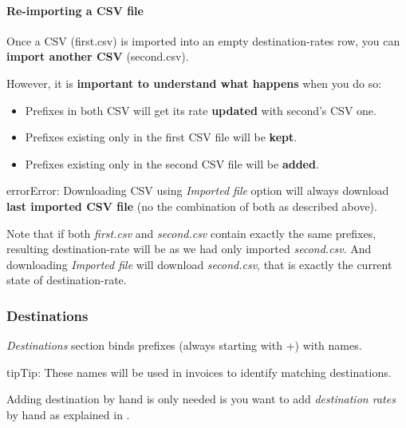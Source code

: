 \documentclass[letterpaper,10pt,english]{sphinxmanual}
\begin{document}
\paragraph{Re-importing a CSV file}
\label{administration_portal/brand/billing/destination_rates:re-importing-a-csv-file}
Once a CSV (first.csv) is imported into an empty destination-rates row, you can \textbf{import another CSV} (second.csv).

However, it is \textbf{important to understand what happens} when you do so:
\begin{itemize}
\item {} 
Prefixes in both CSV will get its rate \textbf{updated} with second's CSV one.

\item {} 
Prefixes existing only in the first CSV file will be \textbf{kept}.

\item {} 
Prefixes existing only in the second CSV file will be \textbf{added}.

\end{itemize}

\begin{notice}{error}{Error:}
Downloading CSV using \emph{Imported file} option will always download \textbf{last imported CSV file} (no the
combination of both as described above).
\end{notice}

Note that if both \emph{first.csv} and \emph{second.csv} contain exactly the same prefixes, resulting destination-rate will be as
we had only imported \emph{second.csv}. And downloading \emph{Imported file} will download \emph{second.csv}, that is exactly the current
state of destination-rate.


\subsubsection{Destinations}
\label{administration_portal/brand/billing/destinations::doc}\label{administration_portal/brand/billing/destinations:destinations}
\emph{Destinations} section binds prefixes (always starting with +) with names.

\begin{notice}{tip}{Tip:}
These names will be used in invoices to identify matching destinations.
\end{notice}

Adding destination by hand is only needed is you want to add \emph{destination rates} by hand as explained in {\hyperref[administration_portal/brand/billing/destination_rates:add\string-rates\string-manually]{}}.
\end{document}
